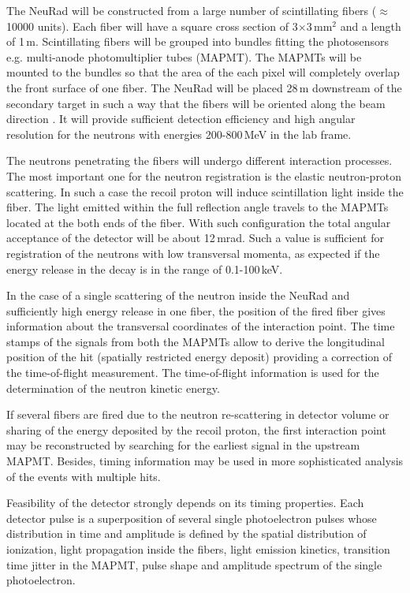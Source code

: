 \documentclass{webofc}
\begin{document}
The NeuRad will be constructed from a large number of scintillating fibers ($\approx$10000 units). Each fiber will have a square cross section of 3$\times$3\,mm$^2$ and a length of 1\,m. Scintillating fibers will be grouped into bundles fitting the photosensors e.g. multi-anode photomultiplier tubes (MAPMT). The MAPMTs will be mounted to the bundles so that the area of the each pixel will completely overlap the front surface of one fiber.
%
The NeuRad will be placed 28\,m downstream of the secondary target in such a way that the fibers will be oriented along the beam direction \cite{report}.
It will provide sufficient detection efficiency and high angular resolution for the neutrons with energies 200-800\,MeV in the lab frame.

The neutrons penetrating the fibers will undergo different interaction processes. The most important one for the neutron registration is the elastic neutron-proton scattering. In such a case the recoil proton will induce scintillation light inside the fiber.
The light emitted within the full reflection angle travels to the MAPMTs located at the both ends of the fiber.
With such configuration the total angular acceptance of the detector will be about 12\,mrad.
Such a value is sufficient for registration of the neutrons with low transversal momenta, as expected if the energy release in the decay is in the range of 0.1-100\,keV.

In the case of a single scattering of the neutron inside the NeuRad and sufficiently high energy release in one fiber, the position of the fired fiber gives information about the transversal coordinates of the interaction point. The time stamps of the signals from both the MAPMTs allow to derive the longitudinal position of the hit (spatially restricted energy deposit) providing a correction of the time-of-flight measurement. The time-of-flight information is used for the determination of the neutron kinetic energy. 

If several fibers are fired due to the neutron re-scattering in detector volume or sharing of the energy deposited by the recoil proton, the first interaction point may be reconstructed by searching for the earliest signal in the upstream MAPMT. Besides, timing information may be used in more sophisticated analysis of the events with multiple hits.

Feasibility of the detector strongly depends on its timing properties. Each detector pulse is a superposition of several single photoelectron pulses whose distribution in time and amplitude is defined by the  spatial distribution of ionization, light propagation inside the fibers, light emission kinetics, transition time jitter in the MAPMT, pulse shape and amplitude spectrum of the single photoelectron.
\end{document}
